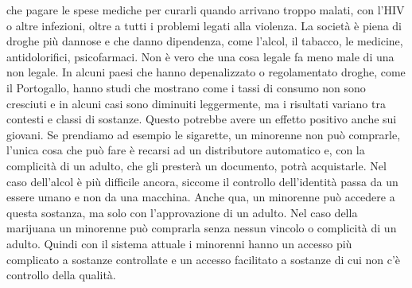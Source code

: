 \documentclass[12pt]{book} %
\begin{document}
\begin{mdframed}[linewidth=1pt]
che pagare le spese mediche per curarli quando arrivano troppo malati, con l'HIV o altre infezioni, oltre a tutti i problemi legati alla violenza. La società è piena di droghe più dannose e che danno dipendenza, come l'alcol, il
tabacco, le medicine, antidolorifici, psicofarmaci. Non è vero che una cosa legale fa meno male di una non legale.
In alcuni paesi che hanno depenalizzato o regolamentato droghe, come il Portogallo, hanno studi che mostrano come i tassi di consumo non sono cresciuti e in alcuni casi sono diminuiti leggermente, ma i risultati variano tra contesti e classi di sostanze. 
Questo potrebbe avere un effetto positivo anche sui giovani. Se prendiamo ad esempio le sigarette, un
minorenne non può comprarle, l'unica cosa che può fare è recarsi ad un distributore automatico e,
con la complicità di un adulto, che gli presterà un documento, potrà acquistarle. Nel caso dell'alcol è più difficile ancora, siccome il controllo dell'identità passa da un essere umano e non da una macchina. Anche qua, un minorenne può accedere a questa sostanza, ma
solo con l'approvazione di un adulto. Nel caso della marijuana un minorenne può comprarla senza
nessun vincolo o complicità di un adulto. Quindi con il sistema attuale i minorenni hanno un accesso più complicato
a sostanze controllate e un accesso facilitato a sostanze di cui non c'è controllo della qualità.
\end{mdframed}
\end{document}
